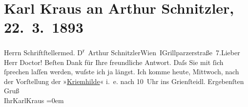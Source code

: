 

         \renewcommand{\erwaehnteOrte}{Orte: Café Griensteidl, Grillparzerstraße, I., Innere Stadt, Wien}
         \renewcommand{\erwaehnteWerke}{Werke: Kriemhilde}
               \section[Karl Kraus an Arthur Schnitzler, 22. 3. 1893]{ Karl Kraus an Arthur Schnitzler, 22. 3. 1893}\nopagebreak{}\rehead{ }\begin{ledgroupsized}[t]{13cm}\normalsize\beginnumbering \toendnotes[C]{\smallbreak\pagebreak[2]} 
\pstart{}{\pb}Herrn
                        Schriftſteller\pend{}\pstart{}med. D\textsuperscript{r} Arthur Schnitzler\pend{}\pstart{}Wien I\pend{}\pstart{}Grillparzerstraße 7.\pend{}{\bigskip}\pstart{}{\pb}Lieber Herr Doctor!\pend\pstart
           Beſten Dank für Ihre freundliche Antwort. Daſs Sie mit ſich ſprechen laſſen
                    werden, wuſste ich ja längst. Ich komme heute, Mittwoch, nach der
                    Vorſtellung der »\uline{Kriemhilde}« i. e. nach 10 Uhr ins
                        Grienſteidl.\pend
           \pstart
           Ergebenſten Gruß{\\[\baselineskip]}Ihr\hspace*{3.5em}\spacefill\mbox{KarlKraus}\pend
           \leftskip=0em{}
         
         \endnumbering{}\end{ledgroupsized}  \newcommand{\dateiname}{L00192}\newcommand{\titel}{Karl Kraus an Arthur Schnitzler, 22. 3. 1893}\newcommand{\editorInnen}{Martin Anton Müller und Gerd-Hermann Susen}
      